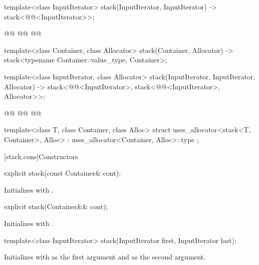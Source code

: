 \documentclass{wg21}
\begin{document}
\begin{codeblock}
{    template<class InputIterator>
    stack(InputIterator, InputIterator)
    -> stack<@@<InputIterator>>;

    @@
    @@
    @@

    template<class Container, class Allocator>
    stack(Container, Allocator) -> stack<typename Container::value_type, Container>;

    template<class InputIterator, class Allocator>
    stack(InputIterator, InputIterator, Allocator)
    -> stack<@@<InputIterator>,
    stack<@@<InputIterator>, Allocator>>;

    @@
    @@
    @@


    template<class T, class Container, class Alloc>
    struct uses_allocator<stack<T, Container>, Alloc>
    : uses_allocator<Container, Alloc>::type { };
}
\end{codeblock}

[stack.cons]{Constructors}

\begin{itemdecl}
    explicit stack(const Container& cont);
\end{itemdecl}

\begin{itemdescr}
    \pnum
    \effects Initializes  with .
\end{itemdescr}

\begin{itemdecl}
    explicit stack(Container&& cont);
\end{itemdecl}

\begin{itemdescr}
    \pnum
    \effects Initializes  with .
\end{itemdescr}

\begin{itemdecl}
    template<class InputIterator>
    stack(InputIterator first, InputIterator last);
\end{itemdecl}

\begin{itemdescr}
    \pnum
    \effects
    Initializes  with  as the first argument and  as the second argument.
\end{itemdescr}
\end{document}

